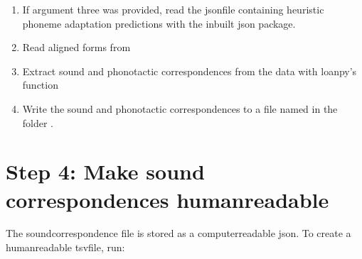 \documentclass[letterpaper,10pt,english]{sphinxmanual}
\begin{document}
{{{{\begin{fulllineitems}
\end{fulllineitems}


\begin{fulllineitems}
\label{\detokenize{mkloanpy:ronataswestoldturkiccommands.minesc.run}}
\pysigstartsignatures
{}
\pysigstopsignatures\begin{enumerate}
%
\item {} 
\sphinxAtStartPar
If argument three was provided, read the json\sphinxhyphen{}file containing heuristic
phoneme adaptation predictions with the inbuilt json package.

\item {} 
\sphinxAtStartPar
Read aligned forms from 

\item {} 
\sphinxAtStartPar
Extract sound and phonotactic correspondences from the data with
loanpy’s 
function

\item {} 
\sphinxAtStartPar
Write the sound and phonotactic correspondences to a file named
 in the folder .

\end{enumerate}

\end{fulllineitems}



\section{Step 4: Make sound correspondences human\sphinxhyphen{}readable}
\label{\detokenize{mkloanpy:step-4-make-sound-correspondences-human-readable}}
\sphinxAtStartPar
The sound\sphinxhyphen{}correspondence file is stored as a computer\sphinxhyphen{}readable json.
To create a human\sphinxhyphen{}readable tsv\sphinxhyphen{}file, run:

}}}}
\end{document}
